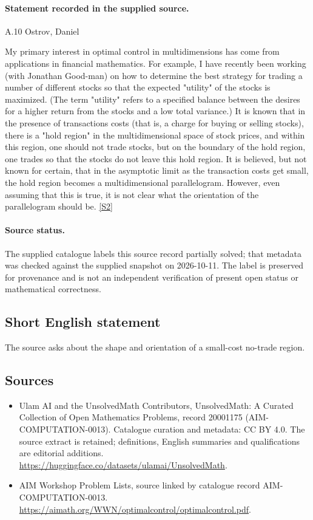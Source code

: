 \documentclass[11pt]{article}
\begin{document}
\paragraph{Statement recorded in the supplied source.}
A.10 Ostrov, Daniel

My primary interest in optimal control in multidimensions has come from applications in financial mathematics. For example, I have recently been working (with Jonathan Good-man) on how to determine the best strategy for trading a number of different stocks so that the expected "utility" of the stocks is maximized. (The term "utility" refers to a specified balance between the desires for a higher return from the stocks and a low total variance.) It is known that in the presence of transactions costs (that is, a charge for buying or selling stocks), there is a "hold region" in the multidimensional space of stock prices, and within this region, one should not trade stocks, but on the boundary of the hold region, one trades so that the stocks do not leave this hold region. It is believed, but not known for certain, that in the asymptotic limit as the transaction costs get small, the hold region becomes a multidimensional parallelogram. However, even assuming that this is true, it is not clear what the orientation of the parallelogram should be. \href{https://aimath.org/WWN/optimalcontrol/optimalcontrol.pdf}{[S2]}
\paragraph{Source status.}
The supplied catalogue labels this source record partially solved; that metadata was checked against the supplied snapshot on 2026-10-11. The label is preserved for provenance and is not an independent verification of present open status or mathematical correctness.
\subsection{Short English statement}
The source asks about the shape and orientation of a small-cost no-trade region.
\subsection{Sources}
\begin{itemize}
\item[S1] Ulam AI and the UnsolvedMath Contributors, UnsolvedMath: A Curated Collection of Open Mathematics Problems, record 20001175 (AIM-COMPUTATION-0013). Catalogue curation and metadata: CC BY 4.0. The source extract is retained; definitions, English summaries and qualifications are editorial additions.
\url{https://huggingface.co/datasets/ulamai/UnsolvedMath}.
\item[S2] AIM Workshop Problem Lists, source linked by catalogue record AIM-COMPUTATION-0013.
\url{https://aimath.org/WWN/optimalcontrol/optimalcontrol.pdf}.
\end{itemize}
\end{document}
